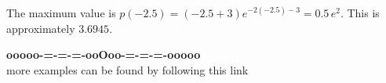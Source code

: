 \documentclass{ximera}
\begin{document}
The maximum value is $p(-2.5) = (-2.5+3)e^{-2(-2.5)-3} = 0.5 \, e^{2}$.  This is approximately $3.6945$.


































\begin{center}
\textbf{\textcolor{green!50!black}{ooooo-=-=-=-ooOoo-=-=-=-ooooo}} \\

more examples can be found by following this link\\ 

\end{center}
\end{document}
